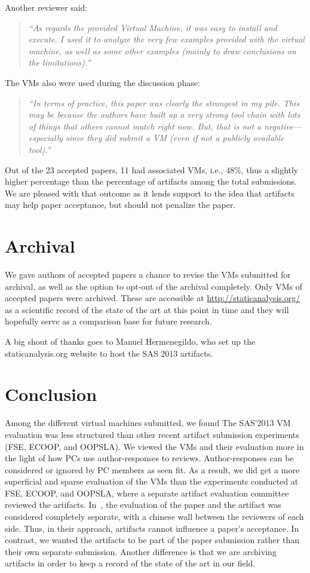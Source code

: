 \documentclass{article}
\begin{document}
\noindent Another reviewer said:
\begin{quote}\itshape
``As regards the provided Virtual Machine, it was easy to install and
 execute. I used it to analyze the very few examples provided with
 the virtual machine, as well as some other examples (mainly to draw
 conclusions on the limitations).''
\end{quote}
 
\noindent The VMs also were used during the discussion phase:
\begin{quote}\itshape
``In terms of practice, this paper was clearly the strongest in my
pile. This may be because the authors have built up a very strong tool
chain with lots of things that others cannot match right now. But,
that is not a negative---especially since they did submit a VM (even
if not a publicly available tool).''
\end{quote}

Out of the 23 accepted papers, 11 had associated VMs, i.e., 48\%, thus
a slightly higher percentage than the percentage of artifacts among
the total submissions. We are pleased with that outcome as it lends
support to the idea that artifacts may help paper acceptance, but
should not penalize the paper.

\section*{Archival}
We gave authors of accepted papers a chance to revise the VMs
submitted for archival, as well as the option to opt-out of the
archival completely. Only VMs of accepted papers were archived. These
are accessible at \url{http://staticanalysis.org/} as a scientific record of
the state of the art at this point in time and they will hopefully
serve as a comparison base for future research.

A big shout of thanks goes to Manuel Hermenegildo, who set
up the staticanalysis.org website to host the SAS 2013 artifacts.

\section*{Conclusion}

Among the different virtual machines submitted, we found 
The SAS'2013 VM evaluation was less structured than other recent
artifact submission experiments \cite{shriramk} (FSE, ECOOP, and
OOPSLA). We viewed the VMs and their evaluation more in the light of
how PCs use author-responses to reviews. Author-responses can be
considered or ignored by PC members as seen fit. As a result, we did
get a more superficial and sparse evaluation of the VMs than the
experiments conducted at FSE, ECOOP, and OOPSLA, where a separate
artifact evaluation committee reviewed the
artifacts. In~\cite{shriramk}, the evaluation of the paper and the
artifact was considered completely separate, with a chinese wall
between the reviewers of each side. Thus, in their approach, artifacts
cannot influence a paper's acceptance. In contrast, we wanted the
artifacts to be part of the paper submission rather than their own
separate submission. Another difference is that we are archiving
artifacts in order to keep a record of the state of the art in our
field.
\end{document}
